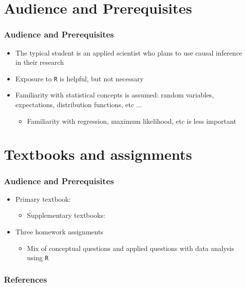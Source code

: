 \documentclass[table, xcolor = {dvipsnames}, 9pt]{beamer}
\theoremstyle{plain}
\begin{document}
\section{Audience and Prerequisites}
\begin{frame}[t]
\frametitle{Audience and Prerequisites}
\vfill
\begin{itemize} \vfill
\item The typical student is an applied scientist who plans to use causal inference in their research \vfill
\item Exposure to \texttt{R} is helpful, but not necessary \vfill
\item Familiarity with statistical concepts is assumed: random variables, expectations, distribution functions, etc ...
\begin{itemize} \vfill
\item Familiarity with regression, maximum likelihood, etc is less important \vfill
\end{itemize}  \vfill 
\end{itemize} \vfill
\vfill
\end{frame}
\section{Textbooks and assignments}
\begin{frame}[t]
\frametitle{Audience and Prerequisites}
\vfill
\begin{itemize} \vfill
\item Primary textbook: \citet{rosenbaum2017} \vfill
\begin{itemize}
\item Supplementary textbooks: \citet{rosenbaum2002,rosenbaum2010,imbensrubin2015,gerbergreen2012} \vfill
\end{itemize}    
\item Three homework assignments \vfill
\begin{itemize} \vfill
\item Mix of conceptual questions and applied questions with data analysis using \texttt{R} \vfill
\end{itemize} \vfill
\end{itemize} \vfill
\vfill
\end{frame}
\begin{frame}
\frametitle{References}
\scriptsize

\end{frame}
\end{document}

